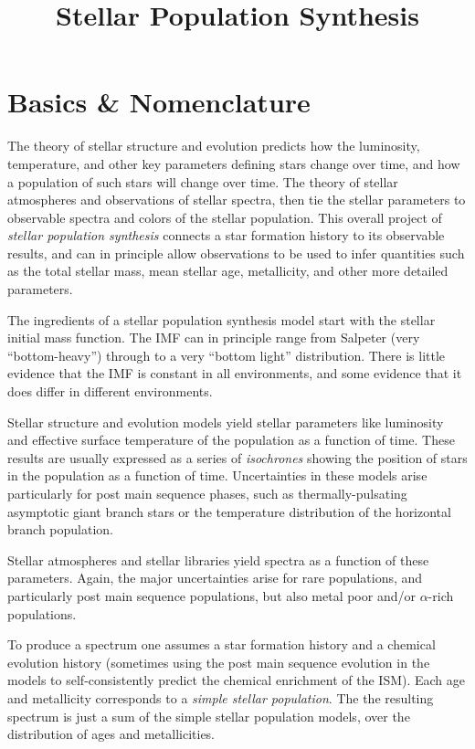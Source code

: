 \title{\bf Stellar Population Synthesis}

\section{Basics \& Nomenclature}

The theory of stellar structure and evolution predicts how the
luminosity, temperature, and other key parameters defining stars
change over time, and how a population of such stars will change over
time. The theory of stellar atmospheres and observations of stellar
spectra, then tie the stellar parameters to observable spectra and
colors of the stellar population. This overall project of {\it stellar
  population synthesis} connects a star formation history to its
observable results, and can in principle allow observations to be used
to infer quantities such as the total stellar mass, mean stellar age,
metallicity, and other more detailed parameters.

The ingredients of a stellar population synthesis model start with the
stellar initial mass function. The IMF can in principle range from
Salpeter (very ``bottom-heavy'') through to a very ``bottom light''
distribution. There is little evidence that the IMF is constant in all
environments, and some evidence that it does differ in different
environments.

Stellar structure and evolution models yield stellar parameters like
luminosity and effective surface temperature of the population as a
function of time. These results are usually expressed as a series of
{\it isochrones} showing the position of stars in the population as a
function of time. Uncertainties in these models arise particularly for
post main sequence phases, such as thermally-pulsating asymptotic
giant branch stars or the temperature distribution of the horizontal
branch population.

Stellar atmospheres and stellar libraries yield spectra as a function
of these parameters. Again, the major uncertainties arise for rare
populations, and particularly post main sequence populations, but also
metal poor and/or $\alpha$-rich populations.

To produce a spectrum one assumes a star formation history and a
chemical evolution history (sometimes using the post main sequence
evolution in the models to self-consistently predict the chemical
enrichment of the ISM). Each age and metallicity corresponds to a {\it
  simple stellar population}.  The the resulting spectrum is just a
sum of the simple stellar population models, over the distribution of
ages and metallicities.


